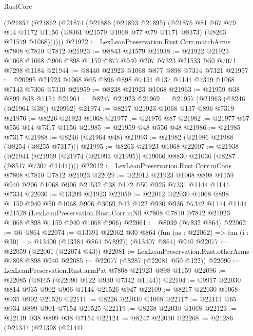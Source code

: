 \begin{lexlean}{RustCore}
\begin{coremodule}
    (@21857
      (@21862
        (@21874
          (@21886
            (@21893 @21895)
            (@21876
              @81
              @67
              @79
              @14
              @1172
              @1156
              (@8361 @21579 @1068 @77 @79 @1171 @8373)
              (@8263 @21579 @1068))))))
@21922 := LexLeanPreservation.Rust.Corr.matchArms @7808 @7810 @7812
@21923 := @8843 @21579
@21938 := @21922
    @21923
    @1068
    @1068
    @906
    @898
    @1159
    @877
    @940
    @207
    @7323
    @21533
    @50
    @7071
    @7298
    @1184
@21944 := @8440 @21923 @1068 @877 @898 @7314 @7321
@21957 := @20995 @21923 @1068 @65 @896 @898 @7154 @137 @1144 @7319 @1068 @7143 @7306 @7310
@21959 := @8238 @21923 @1068
@21963 := @21959 @38 @899 @38 @7154
@21964 := @8247 @21923
@21969 := @21957 (@21963 (@8246 (@21964 @38)) @20962)
@21974 := @8217 @21923 @1068 @137 @896 @7319
@21976 := @8226 @21923 @1068
@21977 := @21976 @87
@21982 := @21977 @67 @556 @14 @7317 @1156
@21985 := @21959 @48 @556 @48
@21986 := @21985 @7317
@21988 := @8246 (@21964 @48)
@21993 := @21982 (@21986 @21988 (@8254 (@8255 @7317)))
@21995 := @8263 @21923 @1068
@22007 := @21938
    (@21944 (@21969 (@21974 (@21993 @21995)) @19066 @8830 @21036 (@8287 (@8517 @7307 @1144))))
@22012 := LexLeanPreservation.Rust.Corr.mCons @7808 @7810 @7812 @21923
@22029 := @22012
    @21923
    @1068
    @898
    @1159
    @940
    @206
    @1068
    @906
    @21532
    @38
    @172
    @50
    @925
    @7331
    @1144
    @1144
    @7334
@22030 := @13299 @21923
@22059 := @22012
    @22030
    @1068
    @898
    @1159
    @940
    @50
    @1068
    @906
    @3069
    @43
    @122
    @930
    @936
    @7342
    @1144
    @1144
    @21528
    (LexLeanPreservation.Rust.Corr.mNil @7808 @7810 @7812 @21923 @1068 @898 @1159 @940 @1068 @906)
@22061 := @8039 (@7832 @864)
@22062 := @6 @864
@22074 := @13391
    @22062
    @30
    @864
    (fun (as : @22062) => fun (i : @30) => @13400 (@13384 @864 @7892))
    (@13407 @864)
    @940
@22077 := @22059 (@22061 (@22074 @43))
@22081 := LexLeanPreservation.Rust.otherArms @7808 @898 @940
@22085 := @22077 (@8287 (@22081 @50 @122))
@22090 := LexLeanPreservation.Rust.armPat @7808 @21923 @898 @1159
@22096 := @22085 (@8165 (@22090 @122 @930 @7342 @1144))
@22104 := @9917 @22030 @814 @935 @902 @906 @1144 @21526 @947
@22109 := @8217 @22030 @1068 @935 @902 @21526
@22111 := @8226 @22030 @1068
@22117 := @22111 @65 @934 @899 @901 @7154 @21525
@22119 := @8238 @22030 @1068
@22123 := @22119 @38 @899 @38 @7154
@22124 := @8247 @22030
@22268 := @21286
    (@21347
      (@21398
        (@21441

\end{coremodule}
\end{lexlean}
